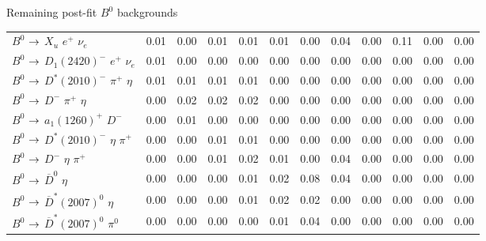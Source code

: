 \documentclass[xcolor=dvipsnames]{beamer}
\begin{document}
\begin{frame}{Remaining post-fit $B^0$ backgrounds}
{{\begin{tabular}{lrrrrrrrrrrr}
      $B^{0}$ $\rightarrow$ $X_u$ $e^{+}$ $\nu_{e}$                     &         0.01 &         0.00 &         0.01 &         0.01 &         0.01 &         0.00 &         0.04 &         0.00 &         0.11 &         0.00 &         0.00 \\
      $B^{0}$ $\rightarrow$ $D_{1}(2420)^{-}$ $e^{+}$ $\nu_{e}$       &         0.01 &         0.00 &         0.00 &         0.00 &         0.00 &         0.00 &         0.00 &         0.00 &         0.00 &         0.00 &         0.00 \\
      $B^{0}$ $\rightarrow$ $D^{*}(2010)^{-}$ $\pi^{+}$ $\eta$        &         0.01 &         0.01 &         0.01 &         0.01 &         0.00 &         0.00 &         0.00 &         0.00 &         0.00 &         0.00 &         0.00 \\
      $B^{0}$ $\rightarrow$ $D^{-}$ $\pi^{+}$ $\eta$                  &         0.00 &         0.02 &         0.02 &         0.02 &         0.00 &         0.00 &         0.00 &         0.00 &         0.00 &         0.00 &         0.00 \\
      $B^{0}$ $\rightarrow$ $a_{1}(1260)^{+}$ $D^{-}$                 &         0.00 &         0.01 &         0.00 &         0.00 &         0.00 &         0.00 &         0.00 &         0.00 &         0.00 &         0.00 &         0.00 \\
      $B^{0}$ $\rightarrow$ $D^{*}(2010)^{-}$ $\eta$ $\pi^{+}$        &         0.00 &         0.00 &         0.01 &         0.01 &         0.00 &         0.00 &         0.00 &         0.00 &         0.00 &         0.00 &         0.00 \\
      $B^{0}$ $\rightarrow$ $D^{-}$ $\eta$ $\pi^{+}$                  &         0.00 &         0.00 &         0.01 &         0.02 &         0.01 &         0.00 &         0.04 &         0.00 &         0.00 &         0.00 &         0.00 \\
      $B^{0}$ $\rightarrow$ $\overline{D}^{0}$ $\eta$                 &         0.00 &         0.00 &         0.00 &         0.01 &         0.02 &         0.08 &         0.04 &         0.00 &         0.00 &         0.00 &         0.00 \\
      $B^{0}$ $\rightarrow$ $\overline{D}^{*}(2007)^{0}$ $\eta$       &         0.00 &         0.00 &         0.00 &         0.01 &         0.02 &         0.02 &         0.00 &         0.00 &         0.00 &         0.00 &         0.00 \\
      $B^{0}$ $\rightarrow$ $\overline{D}^{*}(2007)^{0}$ $\pi^{0}$    &         0.00 &         0.00 &         0.00 &         0.00 &         0.01 &         0.04 &         0.00 &         0.00 &         0.00 &         0.00 &         0.00 \\

\end{tabular}}}
\end{frame}
\end{document}
